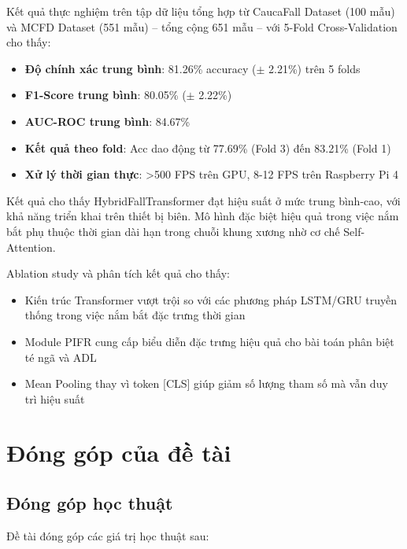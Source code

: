 Kết quả thực nghiệm trên tập dữ liệu tổng hợp từ CaucaFall Dataset (100 mẫu) và MCFD Dataset (551 mẫu) -- tổng cộng 651 mẫu -- với 5-Fold Cross-Validation cho thấy:

\begin{itemize}
    \item \textbf{Độ chính xác trung bình}: 81.26\% accuracy ($\pm$ 2.21\%) trên 5 folds
    \item \textbf{F1-Score trung bình}: 80.05\% ($\pm$ 2.22\%)
    \item \textbf{AUC-ROC trung bình}: 84.67\%
    \item \textbf{Kết quả theo fold}: Acc dao động từ 77.69\% (Fold 3) đến 83.21\% (Fold 1)
    \item \textbf{Xử lý thời gian thực}: >500 FPS trên GPU, 8-12 FPS trên Raspberry Pi 4
\end{itemize}

Kết quả cho thấy HybridFallTransformer đạt hiệu suất ở mức trung bình-cao, với khả năng triển khai trên thiết bị biên. Mô hình đặc biệt hiệu quả trong việc nắm bắt phụ thuộc thời gian dài hạn trong chuỗi khung xương nhờ cơ chế Self-Attention.

Ablation study và phân tích kết quả cho thấy:
\begin{itemize}
    \item Kiến trúc Transformer vượt trội so với các phương pháp LSTM/GRU truyền thống trong việc nắm bắt đặc trưng thời gian
    \item Module PIFR cung cấp biểu diễn đặc trưng hiệu quả cho bài toán phân biệt té ngã và ADL
    \item Mean Pooling thay vì token [CLS] giúp giảm số lượng tham số mà vẫn duy trì hiệu suất
\end{itemize}

\section{Đóng góp của đề tài}
\label{sec:contributions}

\subsection{Đóng góp học thuật}
\label{sec:academic_contributions}

Đề tài đóng góp các giá trị học thuật sau:

